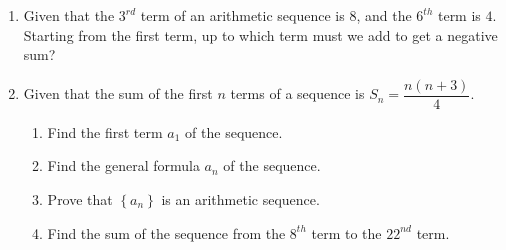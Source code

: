 \documentclass{report}
\begin{document}
\begin{enumerate}
        \item Given that the $3^{rd}$ term of an arithmetic sequence is $8$, and the $6^{th}$ term is $4$. Starting from the first term, up to which term must we add to get a negative sum?
        \item Given that the sum of the first $n$ terms of a sequence is $S_{n}=\dfrac{n(n+3)}{4}$.
        \begin{enumerate}
            \item Find the first term $a_{1}$ of the sequence.
            \item Find the general formula $a_{n}$ of the sequence.
            \item Prove that $\left\{a_{n}\right\}$ is an arithmetic sequence.
            \item Find the sum of the sequence from the $8^{th}$ term to the $22^{nd}$ term.
        \end{enumerate}


\end{enumerate}
\end{document}
